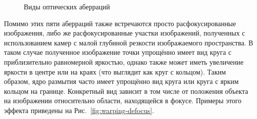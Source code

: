 
\begin{figure}[ht]
	\caption{Виды оптических аберраций~\cite{simpkins2011modeling}}
	\label{fig:warping-aberrations}
\end{figure}

Помимо этих пяти аберраций также встречаются просто расфокусированные изображения, либо же расфокусированные участки изображений, полученных с использованием камер с малой глубиной резкости изображаемого пространства. В таком случае полученное изображение точки упрощённо имеет вид круга с приблизительно равномерной яркостью, однако также может иметь увеличение яркости в центре или на краях (что выглядит как круг с кольцом). Таким образом, ядро размытия часто имеет упрощённо вид круга или круга с ярким кольцом на границе. Конкретный вид зависит в том числе от положения объекта на изображении относительно области, находящейся  в фокусе. Примеры этого эффекта приведены на Рис.~\ref{fig:warping-defocus}.

